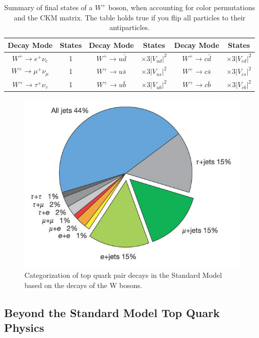 \begin{table}[]
\begin{center}
\begin{tabular}{|c|c|c|c|c|c|}
 \hline 
Decay Mode           			        & States   & Decay Mode                             &  States			   &     Decay Mode 		 	   &     States                          \\   \hline
$W^+ \rightarrow e^+ \nu_e$ 	        &1          &   $W^+ \rightarrow u\bar{d}$   &  $\times 3 |V_{ud}|^2$  &   $W^+ \rightarrow c\bar{d}$  &   $\times 3 |V_{cd}|^2$\\
$W^+ \rightarrow \mu^+ \nu_\mu$   &1          &  $W^+ \rightarrow u\bar{s}$    &  $\times 3 |V_{us}|^2$   &   $W^+ \rightarrow c\bar{s}$  &    $\times 3 |V_{cs}|^2$\\
$W^+ \rightarrow \tau^+ \nu_\tau$  &1	 &  $W^+ \rightarrow u\bar{b}$    &  $\times 3 |V_{ub}|^2$  &    $W^+ \rightarrow c\bar{b}$ &  $\times 3 |V_{cb}|^2$ \\ \hline
\end{tabular}
	\caption[Summary of final states of a W boson, when accounting for color permutations and the CKM matrix.]{Summary of final states of a $W^+$ boson, when accounting for color permutations and the CKM matrix.  The table holds true if you flip all particles to their antiparticles.}
	\label{tab:WFinals}
\end{center}
\end{table}

\begin{figure}[h!]
	\centering
	\includegraphics[width=.5\columnwidth]{../ThesisImages/Theory/topdecayproducts.jpg}
	\caption[Categorization of top quark pair decays in the Standard Model based on the decays of the W bosons.]{Categorization of top quark pair decays in the Standard Model based on the decays of the W bosons\cite{Abazov:2004cs}.}
	\label{fig:ttdecayprods}
\end{figure}


\subsection{Beyond the Standard Model Top Quark Physics}


